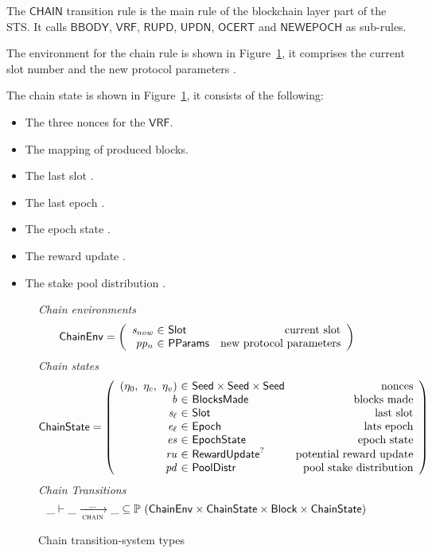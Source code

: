 The $\mathsf{CHAIN}$ transition rule is the main rule of the blockchain layer
part of the STS. It calls $\mathsf{BBODY}$, $\mathsf{VRF}$, $\mathsf{RUPD}$,
$\mathsf{UPDN}$, $\mathsf{OCERT}$ and $\mathsf{NEWEPOCH}$ as sub-rules.

The environment for the chain rule is shown in Figure~\ref{fig:ts-types:chain},
it comprises the current slot number  and the new protocol
parameters .

The chain state is shown in Figure~\ref{fig:ts-types:chain}, it consists of the
following:

\begin{itemize}
\item The three nonces for the $\mathsf{VRF}$.
\item The mapping of produced blocks.
\item The last slot .
\item The last epoch .
\item The epoch state .
\item The reward update .
\item The stake pool distribution .
\end{itemize}

\begin{figure}
  \emph{Chain environments}
  \begin{equation*}
    \ChainEnv =
    \left(
      \begin{array}{r@{~\in~}lr}
        \var{s_{now}} & \Slot & \text{current slot} \\
        \var{pp_n} & \PParams & \text{new protocol parameters} \\
      \end{array}
    \right)
  \end{equation*}
  \emph{Chain states}
  \begin{equation*}
    \ChainState =
    \left(
      \begin{array}{r@{~\in~}lr}
        (\eta_0,~\eta_c,~\eta_v) & \Seed\times\Seed\times\Seed & \text{nonces} \\
        \var{b} & \BlocksMade & \text{blocks made} \\
        \var{s_\ell} & \Slot & \text{last slot} \\
        \var{e_\ell} & \Epoch & \text{lats epoch} \\
        \var{es} & \EpochState & \text{epoch state} \\
        \var{ru} & \RewardUpdate^? & \text{potential reward update} \\
        \var{pd} & \PoolDistr & \text{pool stake distribution} \\
      \end{array}
    \right)
  \end{equation*}
  \emph{Chain Transitions}
  \begin{equation*}
    \_ \vdash \var{\_} \trans{chain}{\_} \var{\_} \subseteq
    \powerset (\ChainEnv \times \ChainState \times \Block \times \ChainState)
  \end{equation*}
  \caption{Chain transition-system types}
  \label{fig:ts-types:chain}
\end{figure}

